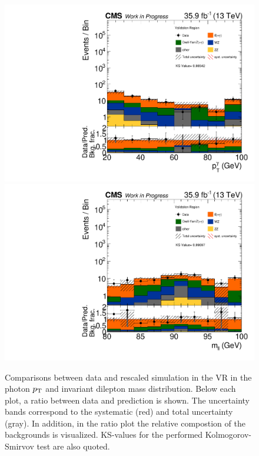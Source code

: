 \begin{figure}[tbp]
 \centering
 \includegraphics[width=\pairwidth]{figures/plots_VR/VR_LL_pt_g1_log}
 \includegraphics[width=\pairwidth]{figures/plots_VR/VR_LL_m_ll_log}
 \caption{Comparisons between data and rescaled simulation in the VR in the photon $p_{\mathrm{T}}$ and invariant dilepton mass distribution. Below each plot, a ratio between data and prediction is shown. The uncertainty bands correspond to the systematic (red) and total uncertainty (gray). In addition, in the ratio plot the relative compostion of the backgrounds is visualized. KS-values for the performed Kolmogorov-Smirvov test are also quoted.}
 \label{fig:VR2}
\end{figure}


